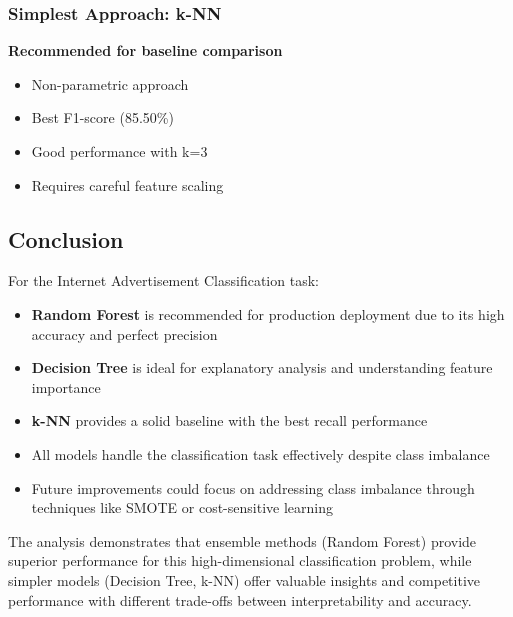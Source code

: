 \subsubsection{Simplest Approach: k-NN}
\textbf{Recommended for baseline comparison}
\begin{itemize}
    \item Non-parametric approach
    \item Best F1-score (85.50\%)
    \item Good performance with k=3
    \item Requires careful feature scaling
\end{itemize}

\subsection{Conclusion}

For the Internet Advertisement Classification task:

\begin{itemize}
    \item \textbf{Random Forest} is recommended for production deployment due to its high accuracy and perfect precision
    \item \textbf{Decision Tree} is ideal for explanatory analysis and understanding feature importance
    \item \textbf{k-NN} provides a solid baseline with the best recall performance
    \item All models handle the classification task effectively despite class imbalance
    \item Future improvements could focus on addressing class imbalance through techniques like SMOTE or cost-sensitive learning
\end{itemize}

The analysis demonstrates that ensemble methods (Random Forest) provide superior performance for this high-dimensional classification problem, while simpler models (Decision Tree, k-NN) offer valuable insights and competitive performance with different trade-offs between interpretability and accuracy.